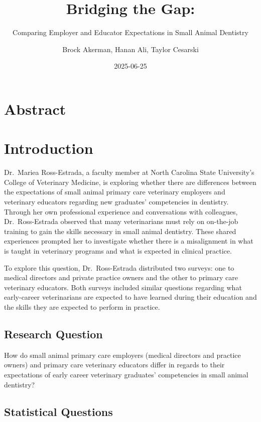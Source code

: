 \documentclass[
  11pt,
  letterpaper,
  DIV=11,
  numbers=noendperiod]{scrartcl}
\title{Bridging the Gap:}
\subtitle{Comparing Employer and Educator Expectations in Small Animal
Dentistry}
\author{Brock Akerman, Hanan Ali, Taylor Cesarski}
\date{2025-06-25}
\numberwithin{figure}{section}
\renewcommand*\contentsname{Table of contents}
\newcommand\contentsname{Table of contents}
\begin{document}
\maketitle

\renewcommand*\contentsname{Table of contents}
{
\hypersetup{linkcolor=}
\setcounter{tocdepth}{2}
\tableofcontents
}

\section{Abstract}\label{abstract}

\section{Introduction}\label{introduction}

Dr.~Mariea Ross-Estrada, a faculty member at North Carolina State
University's College of Veterinary Medicine, is exploring whether there
are differences between the expectations of small animal primary care
veterinary employers and veterinary educators regarding new graduates'
competencies in dentistry. Through her own professional experience and
conversations with colleagues, Dr.~Ross-Estrada observed that many
veterinarians must rely on on-the-job training to gain the skills
necessary in small animal dentistry. These shared experiences prompted
her to investigate whether there is a misalignment in what is taught in
veterinary programs and what is expected in clinical practice.

To explore this question, Dr.~Ross-Estrada distributed two surveys: one
to medical directors and private practice owners and the other to
primary care veterinary educators. Both surveys included similar
questions regarding what early-career veterinarians are expected to have
learned during their education and the skills they are expected to
perform in practice.

\subsection{Research Question}\label{research-question}

How do small animal primary care employers (medical directors and
practice owners) and primary care veterinary educators differ in regards
to their expectations of early career veterinary graduates' competencies
in small animal dentistry?

\subsection{Statistical Questions}\label{statistical-questions}
\end{document}
